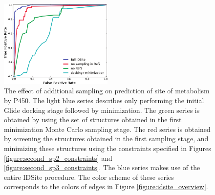 \begin{figure}[h!]
\centering
\includegraphics[width=0.5\textwidth]{figures/idsite/roc_sampling.png}
\caption{The effect of additional sampling on prediction of site of metabolism by P450.
The light blue series describes only performing the initial Glide docking stage followed by minimization.
The green series is obtained by using the set of structures obtained in the first minimization Monte Carlo sampling stage.
The red series is obtained by screening the structures obtained in the first sampling stage, and minimizing these structures using the constraints specified in Figures \ref{figure:second_sp2_constraints} and \ref{figure:second_sp3_constraints}.
The blue series makes use of the entire IDSite procedure.
The color scheme of these series corresponds to the colors of edges in Figure \ref{figure:idsite_overview}.}
\label{figure:idsite_roc_sampling}
\end{figure}

